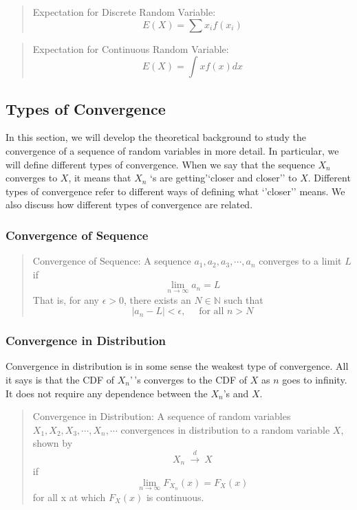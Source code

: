 \documentclass[
  letterpaper,
  DIV=11,
  numbers=noendperiod]{scrreprt}
\theoremstyle{plain}
\theoremstyle{remark}
\begin{document}
\begin{quote}
Expectation for Discrete Random Variable: \[
E(X)=\sum x_i f(x_i)
\]
\end{quote}

\begin{quote}
Expectation for Continuous Random Variable: \[
E(X)=\int x f(x) dx
\]
\end{quote}

\hypertarget{types-of-convergence}{%
\subsection{Types of Convergence}\label{types-of-convergence}}

In this section, we will develop the theoretical background to study the
convergence of a sequence of random variables in more detail. In
particular, we will define different types of convergence. When we say
that the sequence \(X_n\) converges to \(X\), it means that \(X_n\) `s
are getting'`closer and closer'' to \(X\). Different types of
convergence refer to different ways of defining what `'closer'' means.
We also discuss how different types of convergence are related.

\hypertarget{convergence-of-sequence}{%
\subsubsection{Convergence of Sequence}\label{convergence-of-sequence}}

\begin{quote}
Convergence of Sequence: A sequence \(a_1,a_2,a_3, \cdots, a_n\)
converges to a limit \(L\) if \[
\lim_{n\rightarrow \infty} a_n=L
\] That is, for any \(\epsilon>0\), there exists an \(N\in \mathbb{N}\)
such that \[
|a_n-L|<\epsilon, \quad \text{ for all } n> N
\]
\end{quote}

\hypertarget{convergence-in-distribution}{%
\subsubsection{Convergence in
Distribution}\label{convergence-in-distribution}}

Convergence in distribution is in some sense the weakest type of
convergence. All it says is that the CDF of \(X_n\)'\,'s converges to
the CDF of \(X\) as \(n\) goes to infinity. It does not require any
dependence between the \(X_n\)'s and \(X\).

\begin{quote}
Convergence in Distribution: A sequence of random variables
\(X_1,X_2,X_3,\cdots, X_n,\cdots\) convergences in distribution to a
random variable \(X\), shown by\\
\[
X_n \ \xrightarrow{d}\ X
\] if \[
\lim_{n\rightarrow \infty} F_{X_n}(x)=F_X(x)
\] for all x at which \(F_X(x)\) is continuous.
\end{quote}
\end{document}
